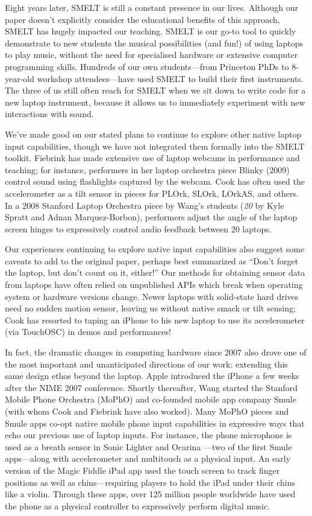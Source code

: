 Eight years later, SMELT is still a constant presence in our lives. Although our paper doesn't explicitly consider the educational benefits of this approach, SMELT has hugely impacted our teaching. SMELT is our go-to tool to quickly demonstrate to new students the musical possibilities (and fun!) of using laptops to play music, without the need for specialised hardware or extensive computer programming skills. Hundreds of our own students---from Princeton PhDs to 8-year-old workshop attendees---have used SMELT to build their first instruments. The three of us still often reach for SMELT when we sit down to write code for a new laptop instrument, because it allows us to immediately experiment with new interactions with sound.

We've made good on our stated plans to continue to explore other native laptop input capabilities, though we have not integrated them formally into the SMELT toolkit. Fiebrink has made extensive use of laptop webcams in performance and teaching; for instance, performers in her laptop orchestra piece Blinky (2009) control sound using flashlights captured by the webcam. Cook has often used the accelerometer as a tilt sensor in pieces for PLOrk, SLOrk, LOrkAS, and others. In a 2008 Stanford Laptop Orchestra piece by Wang's students (\emph{20} by Kyle Spratt and Adnan Marquez-Borbon), performers adjust the angle of the laptop screen hinges to expressively control audio feedback between 20 laptops. 

Our experiences continuing to explore native input capabilities also suggest some caveats to add to the original paper, perhaps best summarized as ``Don't forget the laptop, but don't count on it, either!'' Our methods for obtaining sensor data from laptops have often relied on unpublished APIs which break when operating system or hardware versions change. Newer laptops with solid-state hard drives need no sudden motion sensor, leaving us without native smack or tilt sensing; Cook has resorted to taping an iPhone to his new laptop to use its accelerometer (via TouchOSC) in demos and performances!

In fact, the dramatic changes in computing hardware since 2007 also drove one of the most important and unanticipated directions of our work: extending this same design ethos beyond the laptop. Apple introduced the iPhone a few weeks after the NIME 2007 conference. Shortly thereafter, Wang started the Stanford Mobile Phone Orchestra (MoPhO) and co-founded mobile app company Smule (with whom Cook and Fiebrink have also worked). Many MoPhO pieces and Smule apps co-opt native mobile phone input capabilities in expressive ways that echo our previous use of laptop inputs. For instance, the phone microphone is used as a breath sensor in Sonic Lighter and Ocarina \cite{Wang:2014}---two of the first Smule apps---along with accelerometer and multitouch as a physical input. An early version of the Magic Fiddle iPad app used the touch screen to track finger positions as well as chins---requiring players to hold the iPad under their chins like a violin. Through these apps, over 125 million people worldwide have used the phone as a physical controller to expressively perform digital music.

